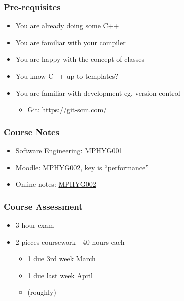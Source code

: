 \subsubsection{Pre-requisites}\label{pre-requisites}

\begin{itemize}
\itemsep1pt\parskip0pt
\item
  You are already doing some C++
\item
  You are familiar with your compiler
\item
  You are happy with the concept of classes
\item
  You know C++ up to templates?
\item
  You are familiar with development eg. version control

  \begin{itemize}
  \itemsep1pt\parskip0pt
  \item
    Git: \url{https://git-scm.com/}
  \end{itemize}
\end{itemize}

\subsubsection{Course Notes}\label{course-notes}

\begin{itemize}
\itemsep1pt\parskip0pt
\item
  Software Engineering:
  \href{http://github-pages.ucl.ac.uk/rsd-engineeringcourse/}{MPHYG001}
\item
  Moodle: \href{https://moodle.ucl.ac.uk/}{MPHYG002}, key is
  ``performance''
\item
  Online notes:
  \href{http://rits.github-pages.ucl.ac.uk/research-computing-with-cpp/}{MPHYG002}
\end{itemize}

\subsubsection{Course Assessment}\label{course-assessment}

\begin{itemize}
\itemsep1pt\parskip0pt
\item
  3 hour exam
\item
  2 pieces coursework - 40 hours each

  \begin{itemize}
  \itemsep1pt\parskip0pt
  \item
    1 due 3rd week March
  \item
    1 due last week April
  \item
    (roughly)
  \end{itemize}
\end{itemize}

